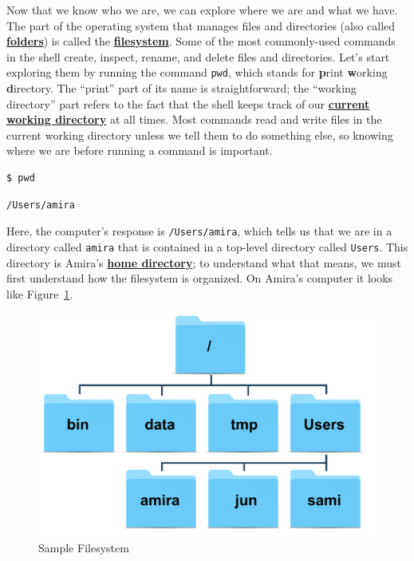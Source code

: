 \documentclass[
]{krantz}
\newcommand{\gref}[2]{\hyperlink{#2}{\textbf{#1}}}
\begin{document}
Now that we know who we are,
we can explore where we are and what we have.
The part of the operating system that manages files and directories (also called \gref{folders}{folder})
is called the \gref{filesystem}{filesystem}.
Some of the most commonly-used commands in the shell create, inspect, rename, and delete files and directories.
Let's start exploring them by running the command \texttt{pwd},
which stands for \textbf{p}rint \textbf{w}orking \textbf{d}irectory.
The ``print'' part of its name is straightforward;
the ``working directory'' part refers to the fact that
the shell keeps track of our \gref{current working directory}{current\_working\_directory} at all times.
Most commands read and write files in the current working directory
unless we tell them to do something else,
so knowing where we are before running a command is important.

\begin{verbatim}
$ pwd
\end{verbatim}

\begin{verbatim}
/Users/amira
\end{verbatim}

Here,
the computer's response is \texttt{/Users/amira},
which tells us that we are in a directory called \texttt{amira}
that is contained in a top-level directory called \texttt{Users}.
This directory is Amira's \gref{home directory}{home\_directory};
to understand what that means,
we must first understand how the filesystem is organized.
On Amira's computer
it looks like Figure~\ref{fig:bash-basics-filesystem}.

\begin{figure}

{\centering \includegraphics[width=0.7\linewidth]{figures/bash-basics/sample-filesystem} 

}

\caption{Sample Filesystem}\label{fig:bash-basics-filesystem}
\end{figure}
\end{document}
